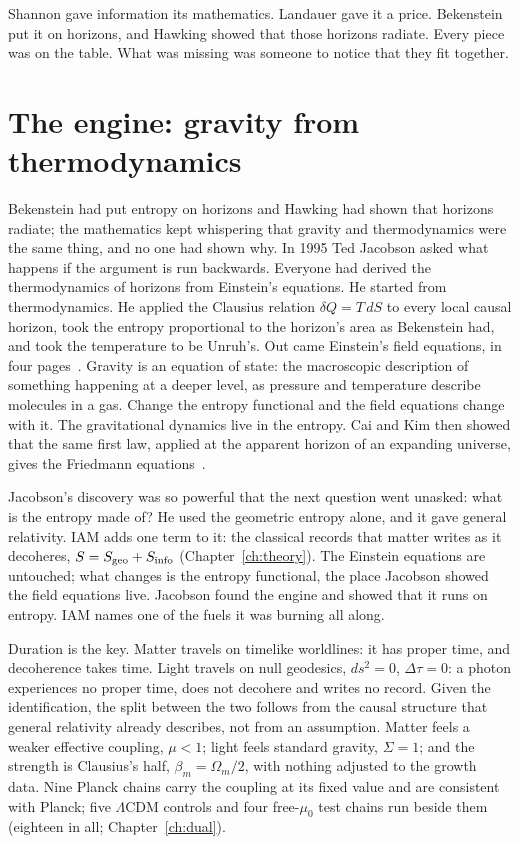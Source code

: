 Shannon gave information its mathematics. Landauer gave it a price. Bekenstein put it on horizons, and Hawking showed that those horizons
radiate. Every piece was on the table. What was missing was someone to notice that they fit together.

\section*{The engine: gravity from thermodynamics}

Bekenstein had put entropy on horizons and Hawking had shown that horizons radiate; the mathematics kept whispering that gravity and thermodynamics were the same thing, and no one had shown why. In 1995 Ted Jacobson asked what
happens if the argument is run backwards. Everyone had derived the thermodynamics of horizons from Einstein's equations. He started from
thermodynamics. He applied the Clausius relation $\delta Q=T\,dS$ to every local causal horizon, took the entropy proportional to the
horizon's area as Bekenstein had, and took the temperature to be Unruh's. Out came Einstein's field equations, in four
pages~\cite{Jacobson1995}. \derived{} Gravity is an equation of state: the macroscopic description of something happening at a deeper level,
as pressure and temperature describe molecules in a gas. Change the entropy functional and the field equations change with it. The
gravitational dynamics live in the entropy. Cai and Kim then showed that the same first law, applied at the apparent horizon of an expanding
universe, gives the Friedmann equations~\cite{CaiKim2005}. \derived

Jacobson's discovery was so powerful that the next question went unasked: what is the entropy made of? He used the geometric entropy alone,
and it gave general relativity. IAM adds one term to it: the classical records that matter writes as it decoheres, $S=S_{\rm geo}+S_{\rm
info}$ (Chapter~\ref{ch:theory}). \conjecture{} The Einstein equations are untouched; what changes is the entropy functional, the place
Jacobson showed the field equations live. Jacobson found the engine and showed that it runs on entropy. IAM names one of the fuels it was
burning all along.

Duration is the key. Matter travels on timelike worldlines: it has proper time, and decoherence takes time. Light travels on null geodesics,
$ds^2=0$, $\Delta\tau=0$: a photon experiences no proper time, does not decohere and writes no record. Given the identification, the split
between the two follows from the causal structure that general relativity already describes, not from an assumption. \derived{} Matter
feels a weaker effective coupling, $\mu<1$; light feels standard gravity, $\Sigma=1$; and the strength is Clausius's half,
$\beta_m=\Omega_m/2$, with nothing adjusted to the growth data. Nine Planck chains carry the coupling at its fixed value and are consistent with Planck; five
$\Lambda$CDM controls and four free-$\mu_0$ test chains run beside them (eighteen in all; Chapter~\ref{ch:dual}). \measured

